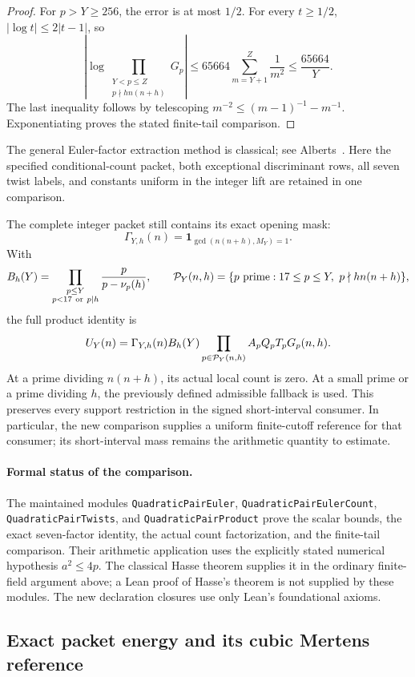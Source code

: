 \documentclass[11pt]{article}
\begin{document}
\begin{proof}
For \(p>Y\geq256\), the error is at most \(1/2\).
For every \(t\geq1/2\), \(|\log t|\leq2|t-1|\), so
\[
 \left|\log\prod_{\substack{Y<p\leq Z\\p\nmid hn(n+h)}}G_p\right|
 \leq65664\sum_{m=Y+1}^{Z}\frac1{m^2}
 \leq\frac{65664}{Y}.
\]
The last inequality follows by telescoping
\(m^{-2}\leq(m-1)^{-1}-m^{-1}\).
Exponentiating proves the stated finite-tail comparison.
\end{proof}

The general Euler-factor extraction method is classical;
see Alberts~\cite{Alberts}. Here the specified conditional-count packet,
both exceptional discriminant rows, all seven twist labels, and constants
uniform in the integer lift are retained in one comparison.

The complete integer packet still contains its exact opening mask:
\[
 \Gamma_{Y,h}(n)=\mathbf1_{\gcd(n(n+h),M_Y)=1}.
\]
With
\[
 B_h(Y)=\prod_{\substack{p\leq Y\\p<17\ {\rm or}\ p\mid h}}
             \frac p{p-\nu_p(h)},\qquad
 {\cal P}_Y(n,h)=\{p\text{ prime}:17\leq p\leq Y,\ p\nmid hn(n+h)\},
\]
the full product identity is
\[
 U_Y(n)=\Gamma_{Y,h}(n)B_h(Y)
           \prod_{p\in{\cal P}_Y(n,h)}A_pQ_pT_pG_p(n,h).
\]
At a prime dividing \(n(n+h)\), its actual local count is zero.
At a small prime or a prime dividing \(h\), the previously defined
admissible fallback is used. This preserves every support restriction
in the signed short-interval consumer. In particular, the new
comparison supplies a uniform finite-cutoff reference for that consumer;
its short-interval mass remains the arithmetic quantity to estimate.

\paragraph{Formal status of the comparison.}
The maintained modules \texttt{QuadraticPairEuler},
\texttt{QuadraticPairEulerCount}, \texttt{QuadraticPairTwists}, and
\texttt{QuadraticPairProduct} prove the scalar bounds, the exact
seven-factor identity, the actual count factorization, and the finite-tail
comparison. Their arithmetic application uses the explicitly stated
numerical hypothesis \(a^2\leq4p\). The classical Hasse theorem supplies
it in the ordinary finite-field argument above; a Lean proof of Hasse's
theorem is not supplied by these modules. The new declaration closures
use only Lean's foundational axioms.


\subsection{Exact packet energy and its cubic Mertens reference}
\end{document}
